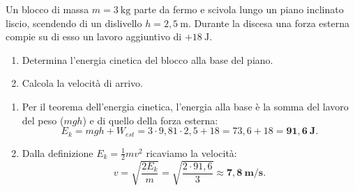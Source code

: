 
\begin{question}[ID=2.3, subtitle={Blocco su piano inclinato liscio con forza esterna aggiuntiva}, tags={forze vive, energia}, difficulty=media]
Un blocco di massa $m = 3\ \text{kg}$ parte da fermo e scivola lungo un piano inclinato liscio, scendendo di un dislivello $h = 2{,}5\ \text{m}$. Durante la discesa una forza esterna compie su di esso un lavoro aggiuntivo di $+18\ \text{J}$.
\begin{enumerate}
    \item Determina l'energia cinetica del blocco alla base del piano.
    \item Calcola la velocità di arrivo.
\end{enumerate}
\begin{solution}
\begin{enumerate}
    \item Per il teorema dell'energia cinetica, l'energia alla base è la somma del lavoro del peso ($mgh$) e di quello della forza esterna:
    \[
    E_k = mgh + W_{est} = 3\cdot 9{,}81\cdot 2{,}5 + 18 = 73{,}6 + 18 = \mathbf{91{,}6\ \text{J}}.
    \]
    \item Dalla definizione $E_k = \tfrac{1}{2}mv^2$ ricaviamo la velocità:
    \[
    v = \sqrt{\frac{2E_k}{m}} = \sqrt{\frac{2\cdot 91{,}6}{3}} \approx \mathbf{7{,}8\ \text{m/s}}.
    \]
\end{enumerate}
\end{solution}
\end{question}



